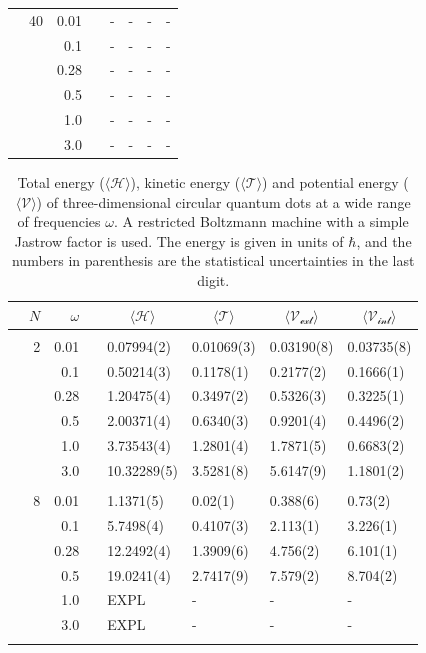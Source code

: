 \begin{table}
\begin{tabularx}{\textwidth}{R{1.5cm}rrcR{2.3cm}R{2.3cm}R{2.3cm}R{2.3cm}}
		&40 & 0.01 && - & - & - & - \\
		&& 0.1 && - & - & - & - \\
		&& 0.28 && - & - & - & - \\
		&& 0.5 && - & - & - & - \\
		&& 1.0 && - & - & - & - \\
		&& 3.0 && - & - & - & - \\ \hline \hline
	\end{tabularx}
\end{table}

\begin{table}
	\caption{Total energy ($\langle \mathcal{H}\rangle$), kinetic energy ($\langle\mathcal{T}\rangle$) and potential energy ($\langle \mathcal{V}\rangle$) of three-dimensional circular quantum dots at a wide range of frequencies $\omega$. A restricted Boltzmann machine with a simple Jastrow factor is used. The energy is given in units of $\hbar$, and the numbers in parenthesis are the statistical uncertainties in the last digit.}
	\label{tab:splitfrequencyQDRBMSJ3D}
	\begin{tabularx}{\textwidth}{R{1.5cm}rrcR{2.3cm}R{2.3cm}R{2.3cm}R{2.3cm}} \hline\hline
		& & $\omega$ &&  &  &  &  \\ \hline \\
		&2 & 0.01 && 0.07994(2) & 0.01069(3) & 0.03190(8) & 0.03735(8) \\
		&& 0.1 && 0.50214(3) & 0.1178(1) & 0.2177(2) & 0.1666(1) \\
		&& 0.28 && 1.20475(4) & 0.3497(2) & 0.5326(3) & 0.3225(1) \\
		&& 0.5 && 2.00371(4) & 0.6340(3) & 0.9201(4) & 0.4496(2) \\
		&& 1.0 && 3.73543(4) & 1.2801(4) & 1.7871(5) & 0.6683(2) \\
		&& 3.0 && 10.32289(5) & 3.5281(8) & 5.6147(9) & 1.1801(2) \\ \hdashline \\
		
		&8 & 0.01 && 1.1371(5) & 0.02(1) & 0.388(6) & 0.73(2) \\
		&& 0.1 && 5.7498(4) & 0.4107(3) & 2.113(1) & 3.226(1) \\
		&& 0.28 && 12.2492(4) & 1.3909(6) & 4.756(2) & 6.101(1) \\
		&& 0.5 && 19.0241(4) & 2.7417(9) & 7.579(2) & 8.704(2) \\
		&& 1.0 && EXPL & - & - & - \\
		&& 3.0 && EXPL & - & - & - \\ \hdashline \\
		

\end{tabularx}
\end{table}
